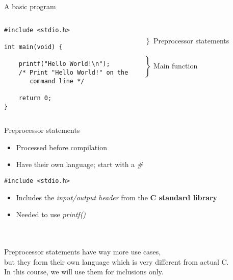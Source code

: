 \begin{frame}[fragile = singleslide]{A basic program}
	\begin{columns}[T]
		\begin{lstlisting}
#include <stdio.h>

int main(void) {

	printf("Hello World!\n");
	/* Print "Hello World!" on the
	   command line */

	return 0;
}
\end{lstlisting}
		
		\ \\$\left. \begin{array}{c}\\\end{array}\right\rbrace $ Preprocessor statements
		\ \\\ \\$\left. \begin{array}{c}\\\\\\\\\\\\\end{array}\right\rbrace $ Main function
	\end{columns}
\end{frame}

\begin{frame}[fragile = singleslide]{Preprocessor statements}
	\begin{itemize}
		\item Processed before compilation
		\item Have their own language; start with a \textit{\#}
	\end{itemize}
	\begin{lstlisting}
#include <stdio.h>
\end{lstlisting}
	\begin{itemize}
		\item Includes the \textit{input/output header} from the \textbf{C standard library}
		\item Needed to use \textit{printf()}
	\end{itemize}\ \\ \ \\
	Preprocessor statements have way more use cases,\\
	but they form their own language which is very different from actual C.\\
	\bigskip
	In this course, we will use them for inclusions only.
\end{frame}

